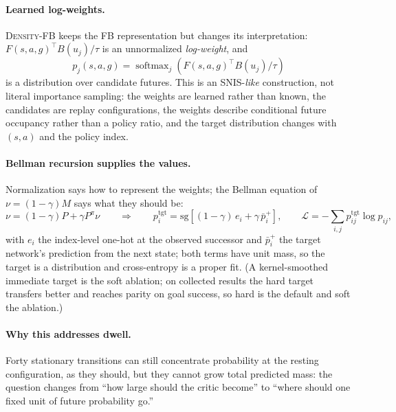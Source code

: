 \documentclass{article}
\newcommand{\sg}{\mathrm{sg}}
\newcommand{\DensityFB}{\textsc{Density-FB}}
\begin{document}
\paragraph{Learned log-weights.}
\DensityFB{} keeps the FB representation but changes its interpretation: $F(s,a,g)^\top B(u_j)/\tau$ is an unnormalized \emph{log-weight}, and
\begin{equation}
p_j(s,a,g) = \operatorname{softmax}_j\!\left( F(s,a,g)^\top B(u_j)/\tau \right)
\end{equation}
is a distribution over candidate futures.
This is an SNIS-\emph{like} construction, not literal importance sampling: the weights are learned rather than known, the candidates are replay configurations, the weights describe conditional future occupancy rather than a policy ratio, and the target distribution changes with $(s,a)$ and the policy index.

\paragraph{Bellman recursion supplies the values.}
Normalization says how to represent the weights; the Bellman equation of $\nu = (1-\gamma)M$ says what they should be:
\begin{equation}
\nu = (1-\gamma)P + \gamma P^\pi \nu
\qquad\Longrightarrow\qquad
p_i^{\mathrm{tgt}} = \sg\!\left[ (1-\gamma)\,e_i + \gamma\,\bar p_i^{+} \right],
\qquad
\mathcal L = -\sum_{i,j} p^{\mathrm{tgt}}_{ij} \log p_{ij},
\end{equation}
with $e_i$ the index-level one-hot at the observed successor and $\bar p_i^+$ the target network's prediction from the next state; both terms have unit mass, so the target is a distribution and cross-entropy is a proper fit.
(A kernel-smoothed immediate target is the soft ablation; on collected results the hard target transfers better and reaches parity on goal success, so hard is the default and soft the ablation.)

\paragraph{Why this addresses dwell.}
Forty stationary transitions can still concentrate probability at the resting configuration, as they should, but they cannot grow total predicted mass: the question changes from ``how large should the critic become'' to ``where should one fixed unit of future probability go.''
\end{document}
